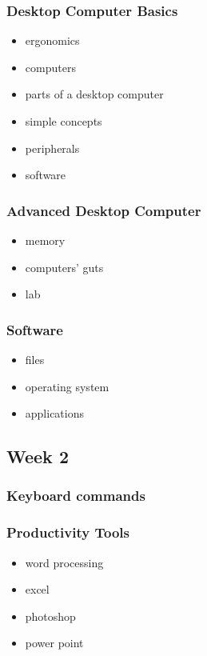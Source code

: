 \documentclass[11pt]{article}
\begin{document}
\subsubsection*{Desktop Computer Basics}

\begin{itemize}\itemsep.5pt
\item ergonomics
\item computers
\item parts of a desktop computer
\item simple concepts
\item peripherals
\item software
\end{itemize}

\subsubsection*{Advanced Desktop Computer}

\begin{itemize}\itemsep.5pt
\item memory
\item computers' guts
\item lab
\end{itemize}

\subsubsection*{Software}

\begin{itemize}\itemsep.5pt
\item files
\item operating system
\item applications
\end{itemize}

\subsection*{Week 2}

\subsubsection*{Keyboard commands}

\subsubsection*{Productivity Tools}

\begin{itemize}\itemsep.5pt
\item word processing
\item excel
\item photoshop
\item power point
\end{itemize}
\end{document}
